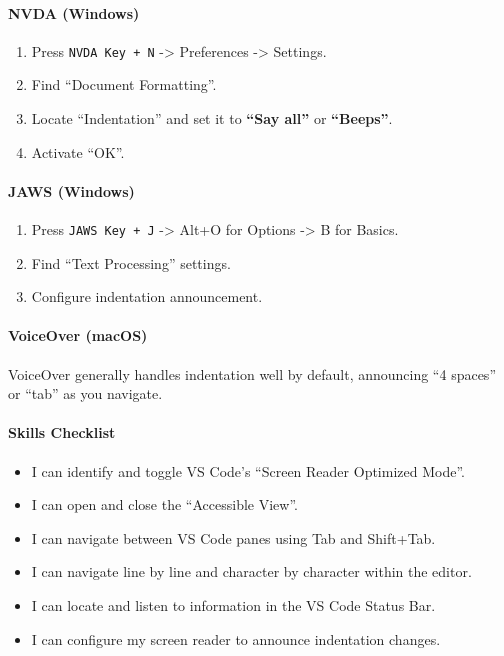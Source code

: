 \documentclass[
  justified,
  openright,
]{tufte-book}
\let\subsection\paragraph
\let\paragraph\paragraph
\let\subsection\paragraph
\let\paragraph\paragraph
\providecommand{\tightlist}{%
  \setlength{\itemsep}{0pt}\setlength{\parskip}{0pt}}
\begin{document}
\paragraph{NVDA (Windows)}\label{nvda-windows}

\begin{enumerate}
\def\labelenumi{\arabic{enumi}.}
\tightlist
\item
  Press \texttt{NVDA\ Key\ +\ N} -\textgreater{} Preferences
  -\textgreater{} Settings.
\item
  Find ``Document Formatting''.
\item
  Locate ``Indentation'' and set it to \textbf{``Say all''} or
  \textbf{``Beeps''}.
\item
  Activate ``OK''.
\end{enumerate}

\paragraph{JAWS (Windows)}\label{jaws-windows}

\begin{enumerate}
\def\labelenumi{\arabic{enumi}.}
\tightlist
\item
  Press \texttt{JAWS\ Key\ +\ J} -\textgreater{} Alt+O for Options
  -\textgreater{} B for Basics.
\item
  Find ``Text Processing'' settings.
\item
  Configure indentation announcement.
\end{enumerate}

\paragraph{VoiceOver (macOS)}\label{voiceover-macos}

VoiceOver generally handles indentation well by default, announcing ``4
spaces'' or ``tab'' as you navigate.

\subsection{Skills Checklist}\label{skills-checklist-1}

\begin{itemize}
\tightlist
\item[$\square$]
  I can identify and toggle VS Code's ``Screen Reader Optimized Mode''.
\item[$\square$]
  I can open and close the ``Accessible View''.
\item[$\square$]
  I can navigate between VS Code panes using Tab and Shift+Tab.
\item[$\square$]
  I can navigate line by line and character by character within the
  editor.
\item[$\square$]
  I can locate and listen to information in the VS Code Status Bar.
\item[$\square$]
  I can configure my screen reader to announce indentation changes.
\end{itemize}
\end{document}
